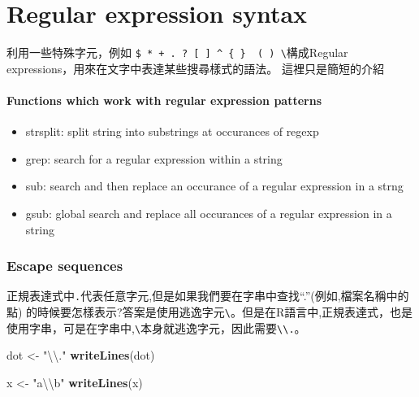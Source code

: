 \documentclass[]{book}
\newenvironment{Shaded}{\begin{snugshade}}{\end{snugshade}}
\newcommand{\KeywordTok}[1]{\textcolor[rgb]{0.13,0.29,0.53}{\textbf{#1}}}
\newcommand{\CharTok}[1]{\textcolor[rgb]{0.31,0.60,0.02}{#1}}
\newcommand{\StringTok}[1]{\textcolor[rgb]{0.31,0.60,0.02}{#1}}
\newcommand{\NormalTok}[1]{#1}
\providecommand{\tightlist}{%
  \setlength{\itemsep}{0pt}\setlength{\parskip}{0pt}}
\theoremstyle{definition}
\theoremstyle{definition}
\theoremstyle{definition}
\theoremstyle{remark}
\begin{document}
\chapter{Regular expression syntax}\label{regular-expression-syntax}

利用一些特殊字元，例如
\texttt{\$\ *\ +\ .\ ?\ {[}\ {]}\ \^{}\ \{\ \}\ \textbar{}\ (\ )\ \textbackslash{}}構成Regular
expressions，用來在文字中表達某些搜尋樣式的語法。 這裡只是簡短的介紹

\subsubsection{Functions which work with regular expression
patterns}\label{functions-which-work-with-regular-expression-patterns}

\begin{itemize}
\tightlist
\item
  strsplit: split string into substrings at occurances of regexp
\item
  grep: search for a regular expression within a string
\item
  sub: search and then replace an occurance of a regular expression in a
  strng
\item
  gsub: global search and replace all occurances of a regular expression
  in a string
\end{itemize}

\subsection{Escape sequences}\label{escape-sequences}

正規表達式中\texttt{.}代表任意字元,但是如果我們要在字串中查找``.''(例如,檔案名稱中的點)
的時候要怎樣表示?答案是使用逃逸字元\texttt{\textbackslash{}}。但是在R語言中,正規表達式，也是使用字串，可是在字串中,\texttt{\textbackslash{}}本身就逃逸字元，因此需要\texttt{\textbackslash{}\textbackslash{}.}。

\begin{Shaded}
\begin{Highlighting}[]
\NormalTok{dot <-}\StringTok{ "}\CharTok{\textbackslash{}\textbackslash{}}\StringTok{."}
\KeywordTok{writeLines}\NormalTok{(dot)}
\end{Highlighting}
\end{Shaded}

\begin{Shaded}
\begin{Highlighting}[]
\NormalTok{x <-}\StringTok{ "a}\CharTok{\textbackslash{}\textbackslash{}}\StringTok{b"}
\KeywordTok{writeLines}\NormalTok{(x)}
\end{Highlighting}
\end{Shaded}
\end{document}
